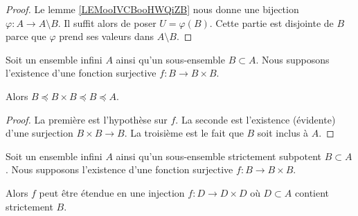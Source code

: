 \begin{proof}
    Le lemme \ref{LEMooIVCBooHWQiZB} nous donne une bijection \( \varphi\colon A\to A\setminus B\). Il suffit alors de poser \( U=\varphi(B)\). Cette partie est disjointe de \( B\) parce que \( \varphi\) prend ses valeurs dans \( A\setminus B\).
\end{proof}

\begin{lemma}
    Soit un ensemble infini \( A\) ainsi qu'un sous-ensemble \( B\subset A\). Nous supposons l'existence d'une fonction surjective \( f\colon B\to B\times B\).

    Alors \( B\preceq B\times B\preceq B\preceq A\).
\end{lemma}

\begin{proof}
    La première est l'hypothèse sur \( f\). La seconde est l'existence (évidente) d'une surjection \( B\times B\to B\). La troisième est le fait que \( B\) soit inclus à \( A\).
\end{proof}

\begin{lemma}     \label{LEMooPOEFooXaifhT}
    Soit un ensemble infini \( A\) ainsi qu'un sous-ensemble strictement subpotent \( B\subset A\). Nous supposons l'existence d'une fonction surjective \( f\colon B\to B\times B\).

    Alors \( f\) peut être étendue en une injection \( f\colon D\to D\times D\) où \( D\subset A\) contient strictement \( B\).
\end{lemma}

